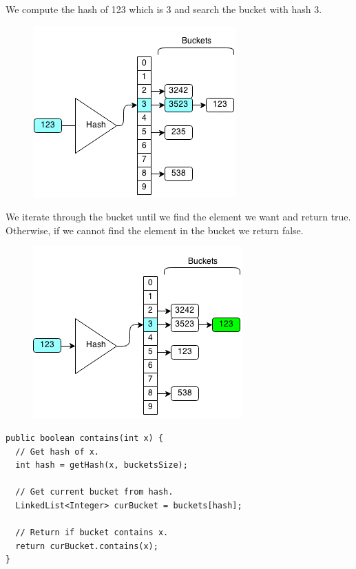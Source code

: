 \documentclass[11pt,oneside]{book}
\makeatletter
\def\maxwidth#1{\ifdim\Gin@nat@width>#1 #1\else\Gin@nat@width\fi}
\makeatother
\begin{document}
We compute the hash of 123 which is 3 and search the bucket with hash 3.

\vspace{5px}\begin{figure}[H]\centering
        \includegraphics[width=0.66\maxwidth{\textwidth}]{hashsetcontains.png}
        \end{figure}

We iterate through the bucket until we find the element we want and return true. Otherwise, if we cannot find the element in the bucket we return false.

\vspace{5px}\begin{figure}[H]\centering
        \includegraphics[width=0.66\maxwidth{\textwidth}]{hashsetcontains3.png}
        \end{figure}

\begin{lstlisting}
public boolean contains(int x) {
  // Get hash of x.
  int hash = getHash(x, bucketsSize);
  
  // Get current bucket from hash.
  LinkedList<Integer> curBucket = buckets[hash];
  
  // Return if bucket contains x.
  return curBucket.contains(x);
}
\end{lstlisting}
\end{document}

